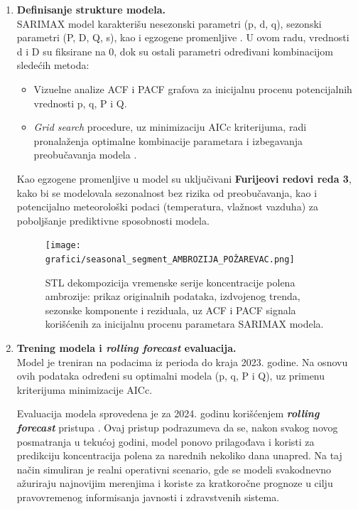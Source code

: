 \documentclass[12pt]{article}
\begin{document}
\begin{enumerate}
    \item \textbf{Definisanje strukture modela.} \\
    SARIMAX model karakterišu nesezonski parametri (p, d, q), sezonski parametri (P, D, Q, s), kao i egzogene promenljive \cite{box1970, brockwell2002}. U ovom radu, vrednosti d i D su fiksirane na 0, dok su ostali parametri određivani kombinacijom sledećih metoda:
    \begin{itemize}
        \item Vizuelne analize ACF i PACF grafova za inicijalnu procenu potencijalnih vrednosti p, q, P i Q.
        \item \textit{Grid search} procedure, uz minimizaciju AICc kriterijuma, radi pronalaženja optimalne kombinacije parametara i izbegavanja preobučavanja modela \cite{burnham2002}.
    \end{itemize}

    Kao egzogene promenljive u model su uključivani \textbf{Furijeovi redovi reda 3}, kako bi se modelovala sezonalnost bez rizika od preobučavanja, kao i potencijalno meteorološki podaci (temperatura, vlažnost vazduha) za poboljšanje prediktivne sposobnosti modela.

    
    \begin{figure}[H]
        \centering
        \texttt{[image: grafici/seasonal\_segment\_AMBROZIJA\_POŽAREVAC.png]}
        \caption{STL dekompozicija vremenske serije koncentracije polena ambrozije: prikaz originalnih podataka, izdvojenog trenda, sezonske komponente i reziduala, uz ACF i PACF signala korišćenih za inicijalnu procenu parametara SARIMAX modela.}
        \label{fig:seasonal_segment_ambrozija}
    \end{figure}

    \item \textbf{Trening modela i \textit{rolling forecast} evaluacija.} \\
    Model je treniran na podacima iz perioda do kraja 2023. godine. Na osnovu ovih podataka određeni su optimalni modela (p, q, P i Q), uz primenu kriterijuma minimizacije AICc.

    Evaluacija modela sprovedena je za 2024. godinu korišćenjem \textbf{\textit{rolling forecast}} pristupa \cite{bergmeir2012use}. Ovaj pristup podrazumeva da se, nakon svakog novog posmatranja u tekućoj godini, model ponovo prilagođava i koristi za predikciju koncentracija polena za narednih nekoliko dana unapred. Na taj način simuliran je realni operativni scenario, gde se modeli svakodnevno ažuriraju najnovijim merenjima i koriste za kratkoročne prognoze u cilju pravovremenog informisanja javnosti i zdravstvenih sistema.


\end{enumerate}
\end{document}
